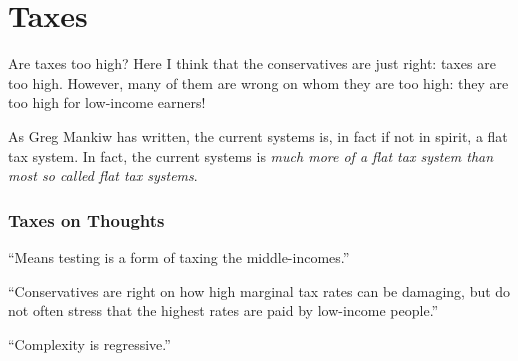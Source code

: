 \chapter{Taxes}%
\label{chpt:taxes}

Are taxes too high? Here I think that the conservatives are just right: taxes
are too high. However, many of them are wrong on whom they are too high: they
are too high for low-income earners!

As Greg Mankiw has written, the current systems is, in fact if not in spirit, a
flat tax system. In fact, the current systems is \emph{much more of a flat tax
system than most so called flat tax systems}.

\subsection{Taxes on Thoughts}

``Means testing is a form of taxing the middle-incomes.''

``Conservatives are right on how high marginal tax rates can be damaging, but
do not often stress that the highest rates are paid by low-income people.''

``Complexity is regressive.''

